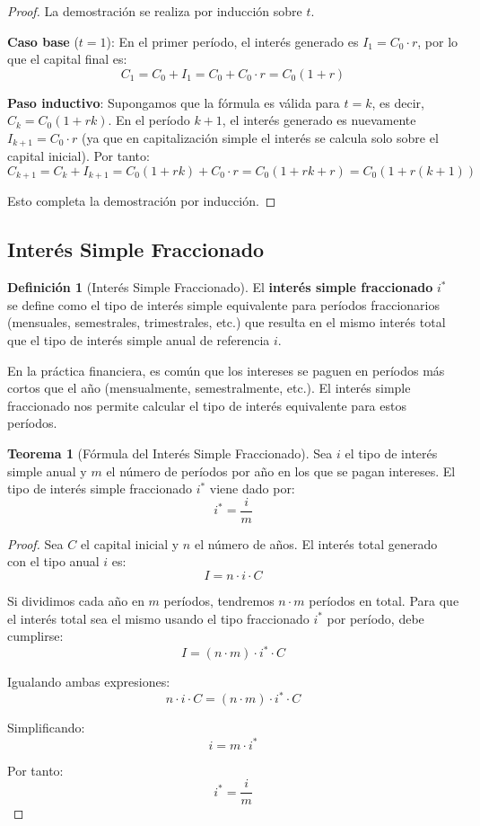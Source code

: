 \documentclass[12pt,a4paper]{article}
\theoremstyle{definition}
\newtheorem{definicion}{Definición}[section]
\newtheorem{teorema}{Teorema}[section]
\begin{document}
\begin{proof}
La demostración se realiza por inducción sobre $t$.

\textbf{Caso base} ($t = 1$): En el primer período, el interés generado es $I_1 = C_0 \cdot r$, por lo que el capital final es:
$$C_1 = C_0 + I_1 = C_0 + C_0 \cdot r = C_0(1 + r)$$

\textbf{Paso inductivo}: Supongamos que la fórmula es válida para $t = k$, es decir, $C_k = C_0(1 + rk)$. En el período $k+1$, el interés generado es nuevamente $I_{k+1} = C_0 \cdot r$ (ya que en capitalización simple el interés se calcula solo sobre el capital inicial). Por tanto:
$$C_{k+1} = C_k + I_{k+1} = C_0(1 + rk) + C_0 \cdot r = C_0(1 + rk + r) = C_0(1 + r(k+1))$$

Esto completa la demostración por inducción.
\end{proof}

\subsection{Interés Simple Fraccionado}

\begin{definicion}[Interés Simple Fraccionado]
El \textbf{interés simple fraccionado} $i^*$ se define como el tipo de interés simple equivalente para períodos fraccionarios (mensuales, semestrales, trimestrales, etc.) que resulta en el mismo interés total que el tipo de interés simple anual de referencia $i$.
\end{definicion}

En la práctica financiera, es común que los intereses se paguen en períodos más cortos que el año (mensualmente, semestralmente, etc.). El interés simple fraccionado nos permite calcular el tipo de interés equivalente para estos períodos.

\begin{teorema}[Fórmula del Interés Simple Fraccionado]
Sea $i$ el tipo de interés simple anual y $m$ el número de períodos por año en los que se pagan intereses. El tipo de interés simple fraccionado $i^*$ viene dado por:
\begin{equation}
i^* = \frac{i}{m}
\end{equation}
\end{teorema}

\begin{proof}
Sea $C$ el capital inicial y $n$ el número de años. El interés total generado con el tipo anual $i$ es:
$$I = n \cdot i \cdot C$$

Si dividimos cada año en $m$ períodos, tendremos $n \cdot m$ períodos en total. Para que el interés total sea el mismo usando el tipo fraccionado $i^*$ por período, debe cumplirse:
$$I = (n \cdot m) \cdot i^* \cdot C$$

Igualando ambas expresiones:
$$n \cdot i \cdot C = (n \cdot m) \cdot i^* \cdot C$$

Simplificando:
$$i = m \cdot i^*$$

Por tanto:
$$i^* = \frac{i}{m}$$
\end{proof}
\end{document}
